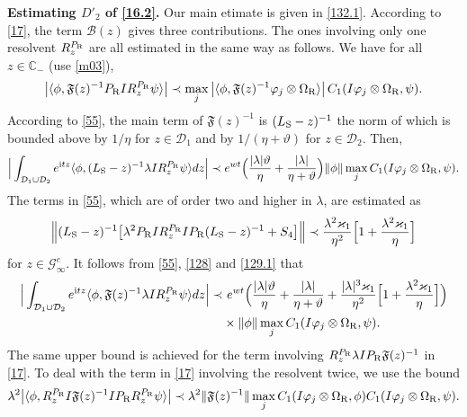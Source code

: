 \documentclass[letterpaper,onecolumn,11pt,accepted=2021-12-09]{quantumarticle}
\numberwithin{equation}{section}
\renewcommand{\r}{{\rm R}}
\newcommand{\s}{{\rm S}}
\renewcommand{\i}{{\rm i}}
\begin{document}
\noindent
{\bf Estimating $D'_2$ of \eqref{16.2}. } Our main etimate is given in \eqref{132.1}. According to \eqref{17}, the term ${\mathcal B}(z)$ gives three contributions. The ones involving only one resolvent $R_z^{P_\r}$ are all estimated in the same way as follows. We have for all $z\in{\mathbb C}_-$ (use \eqref{m03}),
\begin{equation}
\big| \langle \phi, {\mathfrak F}(z)^{-1} P_\r I R_z^{P_\r}\psi\rangle\big| \prec \max_j\big| \langle \phi, {\mathfrak F}(z)^{-1}\varphi_j\otimes\Omega_\r\rangle\big|  \, C_1(I\varphi_j\otimes\Omega_\r, \psi).
\label{127.3}
\end{equation}
According to \eqref{55}, the main term of ${\mathfrak F}(z)^{-1}$ is $(L_\s-z)^{-1}$ the norm of which is bounded above by $1/\eta$ for $z\in{\mathcal D}_1$  and by $1/(\eta+\vartheta)$ for $z\in{\mathcal D}_2$. Then,
\begin{equation}
\Big| \int_{{\mathcal D}_1 \cup {\mathcal D}_2} e^{\i tz}\langle \phi, (L_\s-z)^{-1}\lambda I R_z^{P_\r}\psi\rangle dz \Big| \prec e^{wt} \Big( \frac{|\lambda|\vartheta}{\eta} + \frac{|\lambda|}{\eta+\vartheta} \Big) \|\phi\|  \max_j C_1(I\varphi_j\otimes\Omega_\r,\psi). 
\label{128}
\end{equation}
The terms in \eqref{55}, which are of order two and higher in $\lambda$, are estimated as
\begin{equation}
\Big\| (L_\s-z)^{-1} \big[ \lambda^2 P_\r I R_z^{P_\r}I P_\r(L_\s-z)^{-1} + S_4\big] \Big\| \prec \frac{\lambda^2\varkappa_1}{\eta^2} \Big[1+  \frac{\lambda^2\varkappa_1}{\eta}\Big]
\label{129.1}
\end{equation}
for $z\in{\mathcal G}_\infty^e$. It follows from \eqref{55}, \eqref{128} and  \eqref{129.1} that 
\begin{align}
\Big| \int_{{\mathcal D}_1 \cup {\mathcal D}_2} e^{\i tz}\langle \phi, {\mathfrak F}(z)^{-1}\lambda I R_z^{P_\r}\psi\rangle dz \Big|  \prec & 
 \ e^{wt} \Big( \frac{|\lambda|\vartheta}{\eta} + \frac{|\lambda|}{\eta+\vartheta} +\frac{|\lambda|^3\varkappa_1}{\eta^2} \Big[ 1+\frac{\lambda^2\varkappa_1}{\eta}\Big]\Big)\nonumber\\
&\times  \|\phi\|  \max_j C_1(I\varphi_j\otimes\Omega_\r,\psi).
\label{130.1}
\end{align}
The same upper bound is achieved for the term involving $R_z^{P_\r}\lambda I P_\r{\mathfrak F}(z)^{-1}$ in \eqref{17}. To deal with the term in \eqref{17} involving the resolvent twice, we use the bound 
\begin{equation}
\lambda^2 \big|\langle\phi, R_z^{P_\r}I {\mathfrak F}(z)^{-1} IP_\r R_z^{P_\r}\psi\rangle\big| \prec \lambda^2 \|{\mathfrak F}(z)^{-1}\| \max_j  C_1(I\varphi_j\otimes\Omega_\r, \phi)  C_1(I\varphi_j\otimes \Omega_\r,\psi).
\label{131.1}
\end{equation}
\end{document}

